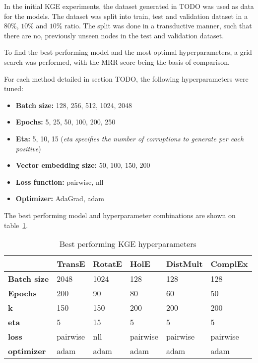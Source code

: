 In the initial KGE experiments, the dataset generated in TODO was used as data for the models.
The dataset was split into train, test and validation dataset in a $80\%$, $10\%$ and $10\%$ ratio.
The split was done in a transductive manner, such that there are no, previously unseen nodes in the test and validation
dataset.

To find the best performing model and the most optimal hyperparameters, a grid search was performed, with the MRR score
being the basis of comparison.

For each method detailed in section TODO, the following hyperparameters were tuned:
\begin{itemize}
    \item \textbf{Batch size:} 128, 256, 512, 1024, 2048
    \item \textbf{Epochs:} 5, 25, 50, 100, 200, 250
    \item \textbf{Eta:} 5, 10, 15 (\textit{eta specifies the number of corruptions to generate per each positive})
    \item \textbf{Vector embedding size:} 50, 100, 150, 200
    \item \textbf{Loss function:} pairwise, nll
    \item \textbf{Optimizer:} AdaGrad, adam
\end{itemize}

The best performing model and hyperparameter combinations are shown on table~\ref{tab:kge-params}.

\begin{table}[!ht]
    \centering
    \begin{tabular}{|l|l|l|l|l|l|}
        \hline
        & \textbf{TransE} & \textbf{RotatE} & \textbf{HolE} & \textbf{DistMult} & \textbf{ComplEx} \\ \hline
        \textbf{Batch size} & 2048 & 1024 & 128 & 128 & 128 \\ \hline
        \textbf{Epochs} & 200 & 90 & 80 & 60 & 50 \\ \hline
        \textbf{k} & 150 & 150 & 200 & 200 & 200 \\ \hline
        \textbf{eta} & 5 & 15 & 5 & 5 & 5 \\ \hline
        \textbf{loss} & pairwise & nll & pairwise & pairwise & pairwise \\ \hline
        \textbf{optimizer} & adam & adam & adam & adam & adam \\ \hline
    \end{tabular}
    \caption{Best performing KGE hyperparameters}
    \label{tab:kge-params}
\end{table}